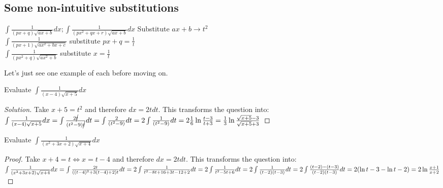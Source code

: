\subsection{Some non-intuitive substitutions}
\begin{theorem}
    $\int \frac{1}{(px+q)\sqrt{ax+b}}dx; \int \frac{1}{(px^2+qx+r)\sqrt{ax+b}}dx$ Substitute $ax+b \to t^2$\\
    $\int \frac{1}{(px+1)\sqrt{ax^2+bx+c}}$ substitute $px+q = \frac{1}{t}$\\
    $\int \frac{1}{(px^2+q)\sqrt{ax^2+b}}$ substitute $x=\frac{1}{t}$
\end{theorem}
Let's just see one example of each before moving on.\\
\begin{example}
    Evaluate $\int \frac{1}{(x-4)\sqrt{x+5}}dx$
\end{example}
\begin{proof}
    [Solution]
    Take $x+5=t^2$ and therefore $dx=2tdt$. This transforms the question into:\\
    $\int \frac{1}{(x-4)\sqrt{x+5}}dx\\
    = \int \frac{2\cancel{t}}{(t^2-9)\cancel{t}}dt\\
    = \int \frac{2}{(t^2-9)}dt\\
    = 2\int \frac{1}{(t^2-9)}dt\\
    = 2 \frac{1}{6} \ln{\frac{t-3}{t+3}}\\
    = \frac{1}{3} \ln{\frac{\sqrt{x+5}-3}{\sqrt{x+5}+3}}
    $
\end{proof}
\begin{example}
    Evaluate $\int \frac{1}{(x^2+3x+2)\sqrt{x+4}}dx$
\end{example}
\begin{proof}
    Take $x+4=t \iff x=t-4$ and therefore $dx=2tdt$. This transforms the question into:\\
    $\int \frac{1}{(x^2+3x+2)\sqrt{x+4}}dx\\
    = \int \frac{2t}{((t-4)^2+3(t-4)+2)t}dt\\
    = 2\int \frac{1}{t^2-8t+16+3t-12+2} dt\\
    = 2\int \frac{1}{t^2-5t+6} dt\\
    = 2\int \frac{1}{(t-2)(t-3)} dt\\
    = 2\int \frac{(t-2)-(t-3)}{(t-2)(t-3)} dt\\
    = 2(\ln{t-3}-\ln{t-2})\\
    = 2\ln{\frac{x+1}{x+2}}
    $
\end{proof}

